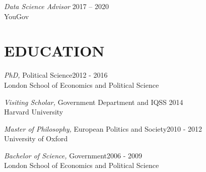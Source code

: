 \documentclass[centered]{res}
\begin{document}
\begin{resume}
{\sl Data Science Advisor} \hfill 2017 -- 2020\\
YouGov


\section{EDUCATION} 

\vspace{.5cm}

		{\sl PhD,} Political Science\hfill 2012 - 2016\\
                London School of Economics and Political Science

		{\sl Visiting Scholar,} Government Department and IQSS \hfill  2014\\
                 Harvard University  

		{\sl Master of Philosophy,} European Politics and Society\hfill 2010 - 2012 \\
                University of Oxford

		{\sl Bachelor of Science,} Government\hfill 2006 - 2009 \\
                London School of Economics and Political Science


\end{resume}
\end{document}
